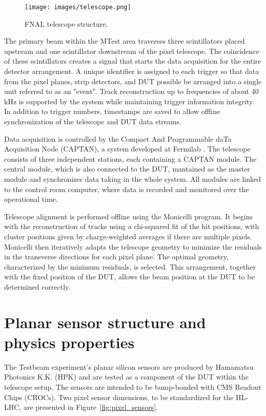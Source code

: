 \begin{figure}[H]
    \centering
    \texttt{[image: images/telescope.png]}
    \caption{FNAL telescope structure.}
    \label{fig:telescope}
\end{figure}

The primary beam within the MTest area traverses three scintillators placed upstream and one scintillator downstream of the pixel telescope. The coincidence of these scintillators creates a signal that starts the data acquisition for the entire detector arrangement. A unique identifier is assigned to each trigger so that data from the pixel planes, strip detectors, and DUT possible be arranged into a single unit referred to as an "event". Track reconstruction up to frequencies of about 40 kHz is supported by the system while maintaining trigger information integrity. In addition to trigger numbers, timestamps are saved to allow offline synchronization of the telescope and DUT data streams.

Data acquisition is controlled by the Compact And Programmable daTa Acquisition Node (CAPTAN), a system developed at Fermilab \cite{Adam_2019}. The telescope consists of three independent stations, each containing a CAPTAN module. The central module, which is also connected to the DUT, mantained as the master module and synchronizes data taking in the whole system. All modules are linked to the control room computer, where data is recorded and monitored over the operational time.

Telescope alignment is performed offline using the Monicelli program. It begins with the reconstruction of tracks using a chi-squared fit of the hit positions, with cluster positions given by charge-weighted averages if there are multiple pixels. Monicelli then iteratively adapts the telescope geometry to minimize the residuals in the transverse directions for each pixel plane. The optimal geometry, characterized by the minimum residuals, is selected. This arrangement, together with the fixed position of the DUT, allows the beam position at the DUT to be determined correctly.

\section{Planar sensor structure and physics properties}

The Testbeam experiment's planar silicon sensors are produced by Hamamatsu Photonics K.K. (HPK) and are tested as a component of the DUT within the telescope setup. The sensors are intended to be bump-bonded with CMS Readout Chips (CROCs). Two pixel sensor dimensions, to be standardized for the HL-LHC, are presented in Figure~\ref{fig:pixel_sensors}.

